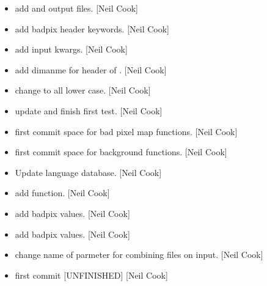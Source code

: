 \documentclass[a4paper,10pt,english]{report}
\begin{document}
\begin{itemize}
\item {} 
 \sphinxhyphen{} add  and  output files.
{[}Neil Cook{]}

\item {} 
 \sphinxhyphen{} add badpix header keywords. {[}Neil Cook{]}

\item {} 
 \sphinxhyphen{} add input kwargs. {[}Neil Cook{]}

\item {} 
 \sphinxhyphen{} add dimanme for header of . {[}Neil
Cook{]}

\item {} 
 \sphinxhyphen{} change  to all lower case. {[}Neil Cook{]}

\item {} 
 \sphinxhyphen{} update and finish first test. {[}Neil Cook{]}

\item {} 
 \sphinxhyphen{} first commit \sphinxhyphen{} space for bad pixel map functions. {[}Neil
Cook{]}

\item {} 
 \sphinxhyphen{} first commit space for background functions. {[}Neil
Cook{]}

\item {} 
Update language database. {[}Neil Cook{]}

\item {} 
 \sphinxhyphen{} add  function. {[}Neil Cook{]}

\item {} 
 \sphinxhyphen{} add badpix values. {[}Neil Cook{]}

\item {} 
 \sphinxhyphen{} add badpix values. {[}Neil Cook{]}

\item {} 
 \sphinxhyphen{} change name of parmeter for combining files on
input. {[}Neil Cook{]}

\item {} 
 \sphinxhyphen{} first commit {[}UNFINISHED{]} {[}Neil Cook{]}


\end{itemize}
\end{document}
